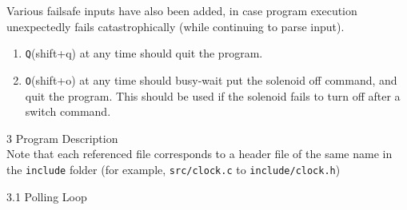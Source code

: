 \documentclass{article}
\begin{document}
Various failsafe inputs have also been added, in case program execution unexpectedly fails catastrophically (while continuing to parse input).
\begin{enumerate}
\item \verb|Q|(shift+q) at any time should quit the program.
\item \verb|O|(shift+o) at any time should busy-wait put the solenoid off command, and quit the program. This should be used if the solenoid fails to turn off after a switch command.
\end{enumerate}

{\huge 3 Program Description}\\

Note that each referenced file corresponds to a header file of the same name in the \verb|include| folder (for example, \verb|src/clock.c| to \verb|include/clock.h|)

{\large 3.1 Polling Loop}
\end{document}
